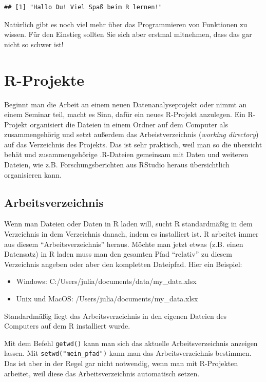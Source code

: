 \documentclass[
]{book}
\providecommand{\tightlist}{%
  \setlength{\itemsep}{0pt}\setlength{\parskip}{0pt}}
\begin{document}
\begin{verbatim}
## [1] "Hallo Du! Viel Spaß beim R lernen!"
\end{verbatim}

Natürlich gibt es noch viel mehr über das Programmieren von Funktionen zu wissen. Für den Einstieg sollten Sie sich aber erstmal mitnehmen, dass das gar nicht so schwer ist!

\hypertarget{r-projekte}{%
\section{R-Projekte}\label{r-projekte}}

Beginnt man die Arbeit an einem neuen Datenanalyseprojekt oder nimmt an einem Seminar teil, macht es Sinn, dafür ein neues R-Projekt anzulegen. Ein R-Projekt organisiert die Dateien in einem Ordner auf dem Computer als zusammengehörig und setzt außerdem das Arbeistverzeichnis (\emph{working directory}) auf das Verzeichnis des Projekts. Das ist sehr praktisch, weil man so die übersicht behät und zusammengehörige .R-Dateien gemeinsam mit Daten und weiteren Dateien, wie z.B. Forschungsberichten aus RStudio heraus übersichtlich organisieren kann.

\hypertarget{arbeitsverzeichnis}{%
\subsection{Arbeitsverzeichnis}\label{arbeitsverzeichnis}}

Wenn man Dateien oder Daten in R laden will, sucht R standardmäßig in dem Verzeichnis in dem Verzeichnis danach, indem es installiert ist. R arbeitet immer aus diesem ``Arbeitsverzeichnis'' heraus.
Möchte man jetzt etwas (z.B. einen Datensatz) in R laden muss man den gesamten Pfad ``relativ'' zu diesem Verzeichnis angeben oder aber den kompletten Dateipfad. Hier ein Beispiel:

\begin{itemize}
\tightlist
\item
  Windows: C:/Users/julia/documents/data/my\_data.xlsx
\item
  Unix und MacOS: /Users/julia/documents/my\_data.xlsx
\end{itemize}

Standardmäßig liegt das Arbeitsverzeichnis in den eigenen Dateien des Computers auf dem R installiert wurde.

Mit dem Befehl \texttt{getwd()} kann man sich das aktuelle Arbeitsverzeichnis anzeigen lassen. Mit \texttt{setwd("mein\_pfad")} kann man das Arbeitsverzeichnis bestimmen. Das ist aber in der Regel gar nicht notwendig, wenn man mit R-Projekten arbeitet, weil diese das Arbeitsverzeichnis automatisch setzen.
\end{document}
